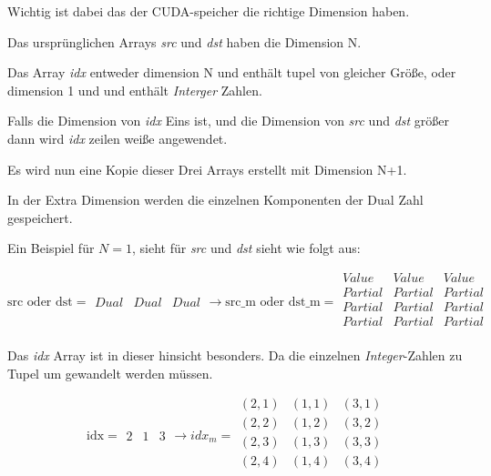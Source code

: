 Wichtig ist dabei das der CUDA-speicher die richtige Dimension haben. 

Das ursprünglichen Arrays \textit{src} und \textit{dst} haben die Dimension N.

Das Array \textit{idx} entweder dimension N und enthält tupel von gleicher Größe,
oder dimension 1 und und enthält \textit{Interger} Zahlen.

Falls die Dimension von \textit{idx} Eins ist, und die Dimension von \textit{src}
und \textit{dst} größer dann wird \textit{idx} zeilen weiße angewendet.

Es wird nun eine Kopie dieser Drei Arrays erstellt mit Dimension N+1.

In der Extra Dimension werden die einzelnen Komponenten der Dual Zahl gespeichert.

Ein Beispiel für $N = 1$, sieht für \textit{src} und \textit{dst} sieht wie folgt aus:

$$

\text{src oder dst} = 

\begin{matrix}
Dual & Dual & Dual
\end{matrix}

\rightarrow

\text{src_m oder dst_m} = 

\begin{matrix}
Value   & Value   & Value   \\
Partial & Partial & Partial \\
Partial & Partial & Partial \\
Partial & Partial & Partial \\
\end{matrix}
$$

Das \textit{idx} Array ist in dieser hinsicht besonders.
Da die einzelnen \textit{Integer}-Zahlen zu Tupel um gewandelt werden müssen. 

$$

\text{idx}= 

\begin{matrix}
 2 & 1 & 3
\end{matrix}

\rightarrow

idx_m = 

\begin{matrix}
 (2, 1) & (1, 1) & (3, 1) \\ 
 (2, 2) & (1, 2) & (3, 2) \\
 (2, 3) & (1, 3) & (3, 3) \\
 (2, 4) & (1, 4) & (3, 4) \\
\end{matrix}
$$

